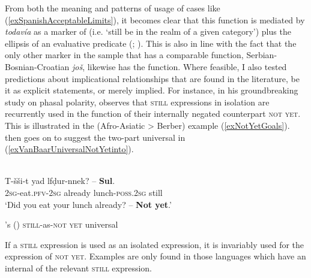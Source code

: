 From both the meaning and patterns of usage of cases like (\ref{exSpanishAcceptableLimits}), it becomes clear that this function is mediated by \textit{todavía} as a marker of  (i.e. \lq{}still be in the realm of a given category\rq{}) plus the ellipsis of an evaluative predicate (\cite{Bosque2016}; \cite{Deloor2012}). This is also in line with the fact that the only other marker in the sample that has a comparable function, Serbian\hyp Bosnian\hyp Croatian \textit{još}, likewise has the  function. Where feasible, I also tested predictions about implicational relationships that are found in the literature, be it as explicit statements, or merely implied. For instance, in his groundbreaking study on phasal polarity, \textcite{vanBaar1997} observes that \textsc{still} expressions in isolation are recurrently used in the function of their internally negated counterpart \textsc{not yet}.  This is illustrated in the  (Afro-Asiatic > Berber) example (\ref{exNotYetGoals}). \Textcite[294–295]{vanBaar1997} then goes on to suggest the two-part universal in (\ref{exVanBaarUniversalNotYetinto}). 

\begin{exe}
	\ex {}\label{exNotYetGoals}\\
	\gll T-šši-t yad lfḍur-nnek? – \textbf{Sul}.\\
	2\textsc{sg}-eat.\textsc{pfv}-2\textsc{sg} already lunch-\textsc{poss}.2\textsc{sg} {} still\\
	\glt \lq Did you eat your lunch already? -- \textbf{Not yet}.' \parencite[342]{Fanego2021}
	
	\ex \citeauthor{vanBaar1997}'s (\citeyear[295]{vanBaar1997}) \textsc{still}-as-\textsc{not yet} universal\label{exVanBaarUniversalNotYetinto} 
	\begin{xlist}
		\ex\label{exVanBaarUniversalNotYet1intro}
		If a \textsc{still} expression is used as an isolated expression, it is invariably used for the expression of \textsc{not yet}.
		\ex\label{exVanBaarUniversalNotYet2intro}
		Examples are only found in those languages which have an internal  of the relevant \textsc{still} expression.
	\end{xlist}
\end{exe}


